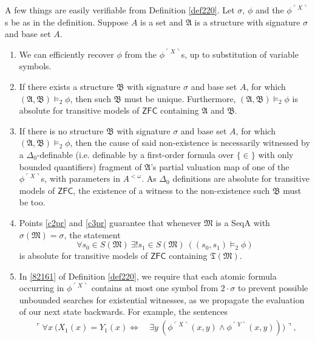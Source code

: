 \documentclass[12pt]{article}
\numberwithin{equation}{section}
\begin{document}
A few things are easily verifiable from Definition \ref{def220}. Let $\sigma$, $\phi$ and the $\phi^{\ulcorner X \urcorner}$s be as in the definition. Suppose $A$ is a set and $\mathfrak{A}$ is a structure with signature $\sigma$ and base set $A$.
\begin{enumerate}[label=(C\arabic*)]
    \item We can efficiently recover $\phi$ from the $\phi^{\ulcorner X \urcorner}$s, up to substitution of variable symbols.
    \item\label{c2pr} If there exists a structure $\mathfrak{B}$ with signature $\sigma$ and base set $A$, for which $(\mathfrak{A}, \mathfrak{B}) \models_2 \phi$, then such $\mathfrak{B}$ must be unique. Furthermore, $(\mathfrak{A}, \mathfrak{B}) \models_2 \phi$ is absolute for transitive models of $\mathsf{ZFC}$ containing $\mathfrak{A}$ and $\mathfrak{B}$.
    \item\label{c3pr} If there is no structure $\mathfrak{B}$ with signature $\sigma$ and base set $A$, for which $(\mathfrak{A}, \mathfrak{B}) \models_2 \phi$, then the cause of said non-existence is necessarily witnessed by a $\Delta_0$-definable (i.e. definable by a first-order formula over $\{\in\}$ with only bounded quantifiers) fragment of $\mathfrak{A}$'s partial valuation map of one of the $\phi^{\ulcorner X \urcorner}$s, with parameters in $A^{< \omega}$. As $\Delta_0$ definitions are absolute for transitive models of $\mathsf{ZFC}$, the existence of a witness to the non-existence such $\mathfrak{B}$ must be too.
    \item\label{c4pr} Points \ref{c2pr} and \ref{c3pr} guarantee that whenever $\mathfrak{M}$ is a SeqA with $\sigma(\mathfrak{M}) = \sigma$, the statement
    \begin{equation*}
        \forall s_0 \in S(\mathfrak{M}) \ \exists ! s_1 \in S(\mathfrak{M}) \ ((s_0, s_1) \models_2 \phi)
    \end{equation*}
    is absolute for transitive models of $\mathsf{ZFC}$ containing $\mathfrak{T}(\mathfrak{M})$.
    \item In \ref{82161} of Definition \ref{def220}, we require that each atomic formula occurring in $\phi^{\ulcorner X \urcorner}$ contains at most one symbol from $2 \cdot \sigma$ to prevent possible unbounded searches for existential witnesses, as we propagate the evaluation of our next state backwards. For example, the sentences 
    \begin{align*}
        \ulcorner \forall x \ (X_1(x) = Y_1(x) \iff & \ \exists y \ (\phi^{\ulcorner X \urcorner}(x, y) \wedge \phi^{\ulcorner Y \urcorner}(x, y))) \urcorner \text{,} \\

\end{align*}
\end{enumerate}
\end{document}
